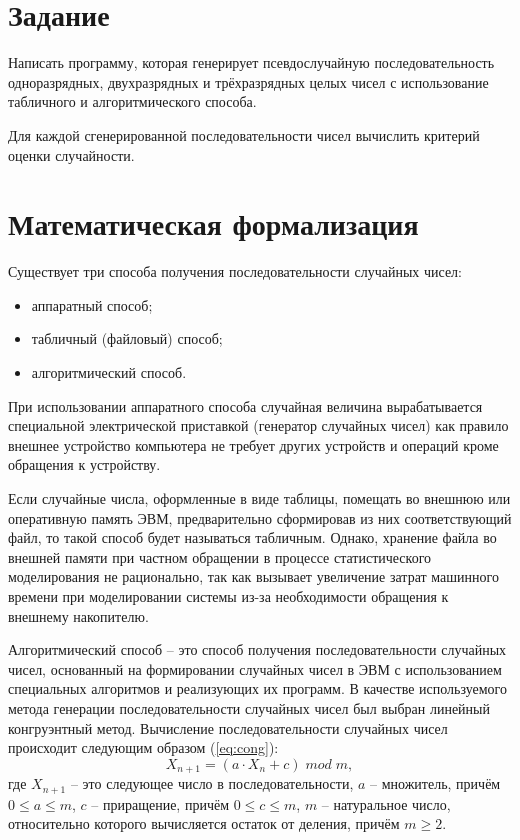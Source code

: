 \chapter{Задание}
Написать программу, которая генерирует псевдослучайную последовательность 
одноразрядных, двухразрядных и трёхразрядных целых чисел с использование 
табличного и алгоритмического способа.

Для каждой сгенерированной последовательности чисел вычислить 
критерий оценки случайности.
\chapter{Математическая формализация}
Существует три способа получения последовательности случайных чисел:
\begin{itemize}
    \item аппаратный способ;
    \item табличный (файловый) способ;
    \item алгоритмический способ.
\end{itemize}

При использовании аппаратного способа случайная величина вырабатывается специальной электрической приставкой
(генератор случайных чисел) как правило внешнее устройство компьютера не требует
других устройств и операций кроме обращения к устройству.

Если случайные числа, оформленные в виде таблицы, помещать во внешнюю или 
оперативную память ЭВМ, предварительно сформировав из них соответствующий файл, 
то такой способ будет называться табличным. Однако, хранение файла во внешней 
памяти при частном обращении в процессе статистического моделирования не 
рационально, так как вызывает увеличение затрат машинного времени при 
моделировании системы из-за необходимости обращения к внешнему накопителю.

Алгоритмический способ – это способ получения последовательности 
случайных чисел, основанный на формировании случайных чисел в ЭВМ 
с использованием специальных алгоритмов и реализующих их программ. В качестве используемого 
метода генерации последовательности случайных чисел был выбран линейный 
конгруэнтный метод. Вычисление последовательности случайных чисел происходит 
следующим образом (\ref{eq:cong}):
\begin{equation}\label{eq:cong}
    X_{n+1} = (a \cdot X_n + c)\;mod\;m,
\end{equation}
где  $X_{n+1}$ -- это следующее число в последовательности, $a$ – множитель, 
причём $0 \leq a \leq m$, $c$ – приращение, причём $0 \leq c \leq m$, $m$ -- натуральное число, 
относительно которого вычисляется остаток от деления, причём $m \geq 2$.

